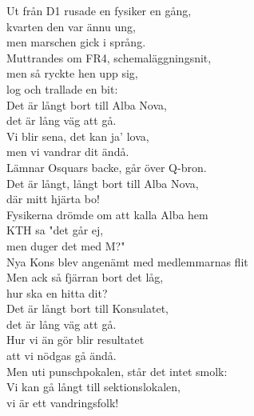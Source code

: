 \documentclass[a6paper, 10pt, twoside]{article}
\begin{document}
\noindent
\begin{center}
\end{center}
\begin{lyrics}
Ut från D1 rusade en fysiker en gång, \\
kvarten den var ännu ung, \\men marschen gick i språng. \\
Muttrandes om FR4, schemaläggningsnit, \\
men så ryckte hen upp sig, \\log och trallade en bit:
\vspace{5pt} \\
Det är långt bort till Alba Nova, \\
det är lång väg att gå. \\
Vi blir sena, det kan ja’ lova, \\ 
men vi vandrar dit ändå. \\
Lämnar Osquars backe, går över Q-bron. \\
Det är långt, långt bort till Alba Nova, \\
där mitt hjärta bo!
\vspace{5pt} \\
Fysikerna drömde om att kalla Alba hem \\
KTH sa "det går ej, \\ men duger det med M?" \\
Nya Kons blev angenämt med medlemmarnas flit \\
Men ack så fjärran bort det låg, \\hur ska en hitta dit?
\vspace{5pt} \\
Det är långt bort till Konsulatet, \\
det är lång väg att gå. \\
Hur vi än gör blir resultatet \\
att vi nödgas gå ändå. \\
Men uti punschpokalen, står det intet smolk: \\
Vi kan gå långt till sektionslokalen,\\
vi är ett vandringsfolk!
\end{lyrics}
\end{document}
